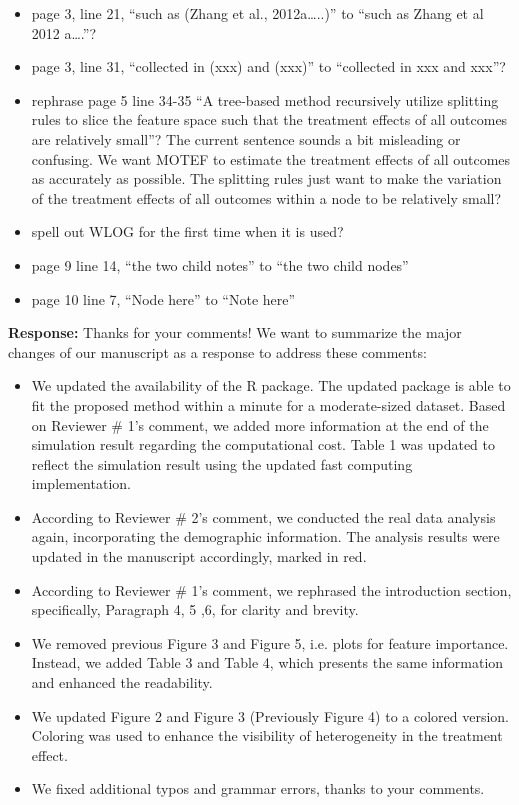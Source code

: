\documentclass[11pt]{article}
\begin{document}
{\em
\begin{itemize}
    \item page 3, line 21, “such as (Zhang et al., 2012a…..)” to “such as Zhang et al 2012 a….”?
    \item page 3, line 31, “collected in (xxx) and (xxx)” to “collected in xxx and xxx”?
    \item rephrase page 5 line 34-35 “A tree-based method recursively utilize splitting rules to slice the feature space such that the treatment effects of all outcomes are relatively small”? The current sentence sounds a bit misleading or confusing. We want MOTEF to estimate the treatment effects of all outcomes as accurately as possible. The splitting rules just want to make the variation of the treatment effects of all outcomes within a node to be relatively small?
    \item spell out WLOG for the first time when it is used?
    \item page 9 line 14, “the two child notes” to “the two child nodes”
    \item page 10 line 7, “Node here” to “Note here”
\end{itemize}
}

\textbf{}

{\bf Response:} Thanks for your comments! We want to summarize the major changes of our manuscript as a response to address these comments:

\begin{itemize}
    \item We updated the availability of the R package. The updated package is able to fit the proposed method within a minute for a moderate-sized dataset. Based on Reviewer \# 1's comment, we added more information at the end of the simulation result regarding the computational cost. Table 1 was updated to reflect the simulation result using the updated fast computing implementation. 
    \item According to Reviewer \# 2's comment, we conducted the real data analysis again, incorporating the demographic information. The analysis results were updated in the manuscript accordingly, marked in red. 
    \item According to Reviewer \# 1's comment, we rephrased the introduction section, specifically, Paragraph 4, 5 ,6, for clarity and brevity.
    \item We removed previous Figure 3 and Figure 5, i.e. plots for feature importance. Instead, we added Table 3 and Table 4, which presents the same information and enhanced the readability.
    \item We updated Figure 2 and Figure 3 (Previously Figure 4) to a colored version. Coloring was used to enhance the visibility of heterogeneity in the treatment effect.
    \item We fixed additional typos and grammar errors, thanks to your comments.
\end{itemize}
\end{document}
